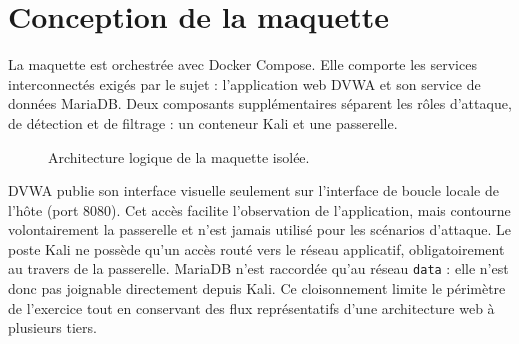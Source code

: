 \section{Conception de la maquette}\label{sec:maquette}

La maquette est orchestrée avec Docker Compose.
Elle comporte les services interconnectés exigés par le sujet : l'application web DVWA et son service de données MariaDB\@.
Deux composants supplémentaires séparent les rôles d'attaque, de détection et de filtrage : un conteneur Kali et une passerelle.

\begin{figure}[H]
    \centering
    \caption{Architecture logique de la maquette isolée.}\label{fig:architecture}
\end{figure}

DVWA publie son interface visuelle seulement sur l'interface de boucle locale de l'hôte (port 8080).
Cet accès facilite l'observation de l'application, mais contourne volontairement la passerelle et n'est jamais utilisé pour les scénarios d'attaque.
Le poste Kali ne possède qu'un accès routé vers le réseau applicatif, obligatoirement au travers de la passerelle.
MariaDB n'est raccordée qu'au réseau \texttt{data} : elle n'est donc pas joignable directement depuis Kali.
Ce cloisonnement limite le périmètre de l'exercice tout en conservant des flux représentatifs d'une architecture web à plusieurs tiers.

